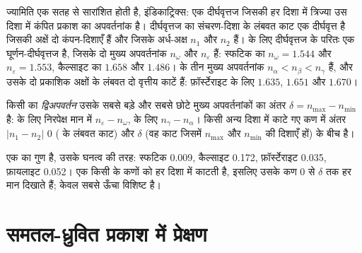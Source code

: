 ज्यामिति एक सतह से सारांशित होती है, इंडिकाट्रिक्स: एक दीर्घवृत्तज जिसकी हर दिशा में त्रिज्या उस दिशा में कंपित प्रकाश
का अपवर्तनांक है। दीर्घवृत्तज का संचरण-दिशा के लंबवत काट एक दीर्घवृत्त है जिसकी अक्षें दो कंपन-दिशाएँ हैं और जिसके
अर्ध-अक्ष $n_1$ और $n_2$ हैं।   के लिए दीर्घवृत्तज  के परितः एक घूर्णन-दीर्घवृत्तज है, जिसके
दो मुख्य अपवर्तनांक $n_\omega$ और $n_\varepsilon$ हैं: स्फटिक का $n_\omega = 1.544$ और $n_\varepsilon = 1.553$, कैल्साइट
का $1.658$ और $1.486$।
  के तीन मुख्य अपवर्तनांक $n_\alpha < n_\beta < n_\gamma$ हैं, और उसके दो प्रकाशिक अक्षों के लंबवत दो
वृत्तीय काटें हैं: फ़ॉर्स्टेराइट के लिए $1.635$, $1.651$ और $1.670$।

\begin{definition}[द्विअपवर्तन (खनिज का)]\label{def:b1:optical-mineralogy:birefringence}
किसी  का \emph{द्विअपवर्तन} उसके सबसे बड़े और सबसे छोटे मुख्य अपवर्तनांकों का अंतर
$\delta = n_{\max} - n_{\min}$ है:   के लिए निरपेक्ष मान में $n_\varepsilon - n_\omega$,  के लिए
$n_\gamma - n_\alpha$। किसी अन्य दिशा में काटे गए कण में अंतर $|n_1 - n_2|$ 0 ( के लंबवत काट) और $\delta$
(वह काट जिसमें $n_{\max}$ और $n_{\min}$ की दिशाएँ हों) के बीच है।
\end{definition}

 एक  का गुण है, उसके घनत्व की तरह: स्फटिक \num{0.009}, कैल्साइट \num{0.172}, फ़ॉर्स्टेराइट \num{0.035},
फ़ायलाइट \num{0.052}। एक  किसी  के कणों को हर दिशा में काटती है, इसलिए उसके कण 0 से $\delta$ तक हर मान
दिखाते हैं; केवल सबसे ऊँचा विशिष्ट है।

\section{समतल-ध्रुवित प्रकाश में प्रेक्षण}

